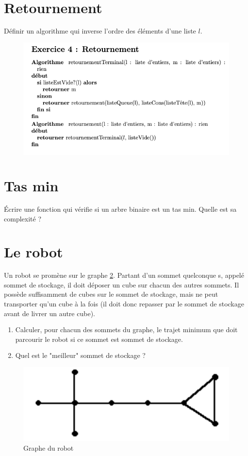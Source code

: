 \documentclass{article}[12pt]
\begin{document}
\section{Retournement}
Définir un algorithme qui inverse l'ordre des éléments d'une liste $l$.

\begin{figure}[h!]
    \centering
    \includegraphics[scale=0.4]{Retournement.png}
    \label{fig:my_label}
\end{figure}


\section{Tas min}
Écrire une fonction qui vérifie si un arbre binaire est un tas min. Quelle est sa complexité ?


\section{Le robot}
Un robot se promène sur le graphe \ref{fig:robot}. Partant d’un sommet quelconque s, appelé sommet de stockage, il doit déposer un cube sur chacun des autres sommets. Il possède suffisamment de cubes sur le sommet de stockage, mais ne peut transporter qu'un cube à la fois (il doit donc repasser par le sommet de stockage avant de livrer un autre cube).
\begin{enumerate}
    \item Calculer, pour chacun des sommets du graphe, le trajet minimum que doit parcourir le robot si ce sommet est sommet de stockage.
    \item Quel est le "meilleur" sommet de stockage ?
\end{enumerate}

\begin{figure}[h!]
    \centering
    \includegraphics{Robot.png}
    \caption{Graphe du robot}
    \label{fig:robot}
\end{figure}
\end{document}
